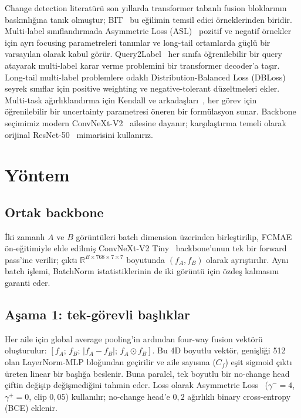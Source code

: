 \documentclass[conference]{IEEEtran}
\begin{document}
Change detection literatürü son yıllarda transformer tabanlı fusion bloklarının baskınlığına tanık olmuştur; BIT~\cite{chen2022bit} bu eğilimin temsil edici örneklerinden biridir. Multi-label sınıflandırmada Asymmetric Loss (ASL)~\cite{ridnik2021asl} pozitif ve negatif örnekler için ayrı focusing parametreleri tanımlar ve long-tail ortamlarda güçlü bir varsayılan olarak kabul görür. Query2Label~\cite{liu2021q2l} her sınıfa öğrenilebilir bir query atayarak multi-label karar verme problemini bir transformer decoder'a taşır. Long-tail multi-label problemlere odaklı Distribution-Balanced Loss (DBLoss)~\cite{wu2020dbloss} seyrek sınıflar için positive weighting ve negative-tolerant düzeltmeleri ekler. Multi-task ağırlıklandırma için Kendall ve arkadaşları~\cite{kendall2018uwl}, her görev için öğrenilebilir bir uncertainty parametresi öneren bir formülasyon sunar. Backbone seçimimiz modern ConvNeXt-V2~\cite{woo2023convnextv2} ailesine dayanır; karşılaştırma temeli olarak orijinal ResNet-50~\cite{he2016resnet} mimarisini kullanırız.

\section{Yöntem}

\subsection{Ortak backbone}

İki zamanlı $A$ ve $B$ görüntüleri batch dimension üzerinden birleştirilip, FCMAE ön-eğitimiyle elde edilmiş ConvNeXt-V2 Tiny~\cite{woo2023convnextv2} backbone'unun tek bir forward pass'ine verilir; çıktı $\mathbb{R}^{B \times 768 \times 7 \times 7}$ boyutunda $(f_A, f_B)$ olarak ayrıştırılır. Aynı batch işlemi, BatchNorm istatistiklerinin de iki görüntü için özdeş kalmasını garanti eder.

\subsection{Aşama 1: tek-görevli başlıklar}

Her aile için global average pooling'in ardından four-way fusion vektörü oluşturulur: $[f_A;\, f_B;\, |f_A - f_B|;\, f_A \odot f_B]$. Bu 4D boyutlu vektör, genişliği 512 olan LayerNorm-MLP bloğundan geçirilir ve aile sayısına ($C_f$) eşit sigmoid çıktı üreten linear bir başlığa beslenir. Buna paralel, tek boyutlu bir no-change head çiftin değişip değişmediğini tahmin eder. Loss olarak Asymmetric Loss~\cite{ridnik2021asl} ($\gamma^-{=}4$, $\gamma^+{=}0$, clip $0{,}05$) kullanılır; no-change head'e $0{,}2$ ağırlıklı binary cross-entropy (BCE) eklenir.
\end{document}
